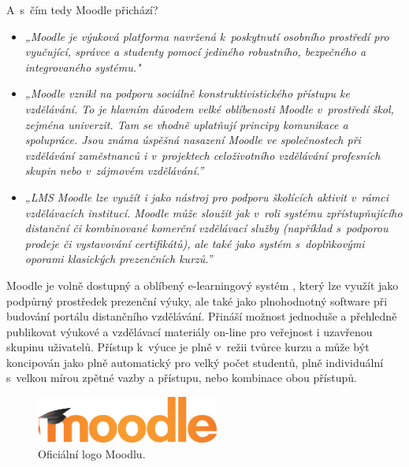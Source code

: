 \documentclass[
print,
  11pt,
  table,   
  nolof,    
  nolot,
  oneside,
  draft
]{fithesis3}
\begin{document}
A~s~čím tedy Moodle přichází?
\begin{itemize}
\item \emph{„Moodle je výuková platforma navržená k~poskytnutí osobního prostředí pro vyučující, správce a studenty pomocí jediného robustního, bezpečného a integrovaného systému."}\cite{moodle-about}		
\item \emph{„Moodle vznikl na podporu sociálně konstruktivistického přístupu ke vzdělávání. To je hlavním důvodem velké oblíbenosti Moodle v~prostředí škol, zejména univerzit. Tam se vhodně uplatňují principy komunikace a spolupráce. Jsou známa úspěšná nasazení Moodle ve společnostech při vzdělávání zaměstnanců i v~projektech celoživotního vzdělávání profesních skupin nebo v~zájmovém vzdělávání.”} \cite{pdcmoodle}
\item \emph{„LMS Moodle lze využít i jako nástroj pro podporu školících aktivit v~rámci vzdělávacích institucí. Moodle může sloužit jak v~roli systému zpřístupňujícího distanční či kombinované komerční vzdělávací služby (například s~podporou prodeje či vystavování certifikátů), ale také jako systém s~doplňkovými oporami klasických prezenčních kurzů.” }\cite{pdcmoodleinst}
\end{itemize}

Moodle je volně dostupný a oblíbený e-learningový systém \cite{capterra}, který lze využít jako podpůrný prostředek prezenční výuky, ale také jako plnohodnotný software při budování portálu distančního vzdělávání. Přináší možnost jednoduše a přehledně publikovat výukové a vzdělávací materiály on-line pro veřejnost i uzavřenou skupinu uživatelů.  Přístup k~výuce je plně v~režii tvůrce kurzu a může být koncipován jako plně automatický pro velký počet studentů, plně individuální s~velkou mírou zpětné vazby a přístupu, nebo kombinace obou přístupů.
\begin{figure}
		  \begin{center}
		    \includegraphics[width=60mm]{images/moodle-logo.png}
		   \end{center}
		  \caption{Oficiální logo Moodlu. \cite{moodle-logo}}
		  \label{fig:moodlelogo}
		\end{figure}
\end{document}
